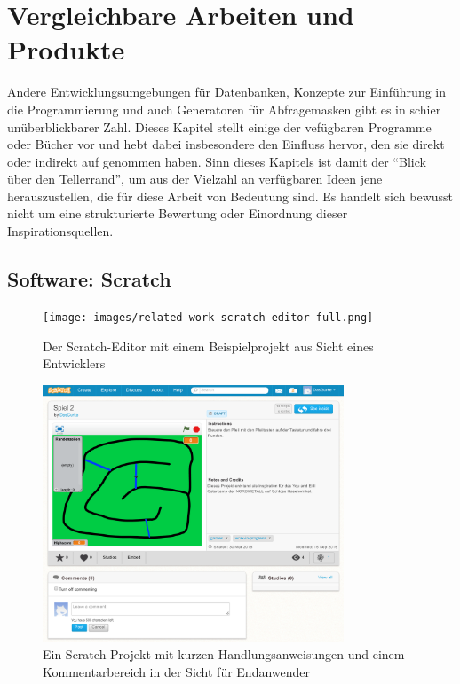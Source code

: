 \section{Vergleichbare Arbeiten und Produkte}
\label{sec:related-work}

Andere Entwicklungsumgebungen für Datenbanken, Konzepte zur Einführung in die Programmierung und auch Generatoren für Abfragemasken gibt es in schier unüberblickbarer Zahl. Dieses Kapitel stellt einige der vefügbaren Programme oder Bücher vor und hebt dabei insbesondere den Einfluss hervor, den sie direkt oder indirekt auf \idename{} genommen haben. Sinn dieses Kapitels ist damit der "`Blick über den Tellerrand"', um aus der Vielzahl an verfügbaren Ideen jene herauszustellen, die für diese Arbeit von Bedeutung sind. Es handelt sich bewusst nicht um eine strukturierte Bewertung oder Einordnung dieser Inspirationsquellen.

\subsection{Software: Scratch}

\begin{figure}[p]
  \centering \texttt{[image: images/related-work-scratch-editor-full.png]}
  \caption{Der Scratch-Editor mit einem Beispielprojekt aus Sicht eines Entwicklers}
  \label{fig:scratch-editor-full}
\end{figure}

\begin{figure}[p]
  \centering \includegraphics[width=0.8\textwidth]{images/related-work-scratch-project-full.png}
  \caption{Ein Scratch-Projekt mit kurzen Handlungsanweisungen und einem Kommentarbereich in der Sicht für Endanwender}
  \label{fig:scratch-enduser-full}
\end{figure}

